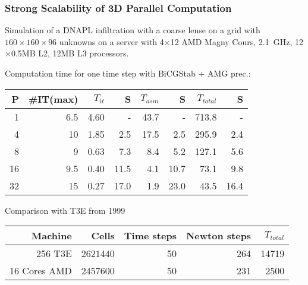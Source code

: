 \begin{frame}
\frametitle<presentation>{Strong Scalability of 3D Parallel Computation}
Simulation of a DNAPL infiltration with a coarse lense on a grid with  $160 \times 160 \times 96$
unknowns on a server with 4$\times$12  AMD Magny Cours, 2.1~GHz, 12$\times$0.5MB L2, 12MB
L3 processors.

Computation time for one time step with BiCGStab + AMG prec.:
\begin{center}
\begin{tabular}{r|rrr|rr|rr}
\hline
P  & \#IT(max) & $T_{it}$ & S & $T_{asm}$ & S & $T_{total}$ & S \\
\hline
 1  &  6.5 & 4.60 &      - &  43.7 &      - & 713.8 &    - \\
 4  &  10  & 1.85 &   2.5 &  17.5 &   2.5 & 295.9 & 2.4 \\
 8  &  9    & 0.63 &   7.3 &    8.4 &   5.2 & 127.1 & 5.6 \\
16 &  9.5 & 0.40 & 11.5 &    4.1 & 10.7 &   73.1 & 9.8 \\
32 &  15  & 0.27 & 17.0 &    1.9 & 23.0 &   43.5 & 16.4 \\
\hline
\end{tabular}
\end{center}

Comparison with T3E from 1999
\begin{center}
\begin{tabular}{r|rrrr}
\hline
Machine  & Cells & Time steps & Newton steps & $T_{total}$ \\
\hline
256 T3E        & 2621440 &  50 & 264 & 14719\\
16 Cores AMD & 2457600 & 50 & 231 & 2500\\
\hline
\end{tabular}
\end{center}
\vfill
\end{frame}


